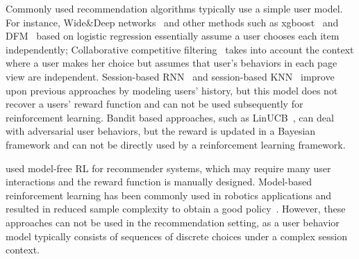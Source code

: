 \documentclass{article} %
\newcommand{\xc}[1]{{\color{blue}{\bf\sf #1}}}
\begin{document}
Commonly used recommendation algorithms typically use a simple user model. For instance, Wide\&Deep networks~\citep{ChengKocHarmsen16} and other methods such as xgboost~\citep{chen2016xgboost} and DFM~\citep{guo2017deepfm} based on logistic regression essentially assume a user chooses each item independently; Collaborative competitive filtering~\citep{YanLonSmoEtal11b} takes into account the context where a user makes her choice but assumes that user's behaviors in each page view are independent. 
Session-based RNN~\citep{HidKarBalTik16} and session-based KNN~\citep{jannach2017recurrent} improve upon previous approaches by modeling users' history, but this model does not recover a users' reward function and can not be used subsequently for reinforcement learning. Bandit based approaches, such as LinUCB~\citep{LiChuLanSch10}, can deal with adversarial user behaviors, but the reward is updated in a Bayesian framework and can not be directly used by a reinforcement learning framework. 



\cite{XiangyuLiangZhuoye18,zhao2018deep,zheng2018drn} used model-free RL for recommender systems, which may require many user interactions and the reward function is manually designed. Model-based reinforcement learning has been commonly used in robotics applications and resulted in reduced sample complexity to obtain a good policy~\citep{DeisenrothFox15,NagabandiKahn17,IgnasiPieter18}.  However, these approaches can not be used in the recommendation setting, as a user behavior model typically consists of sequences of discrete choices under a complex session context.   

\end{document}
